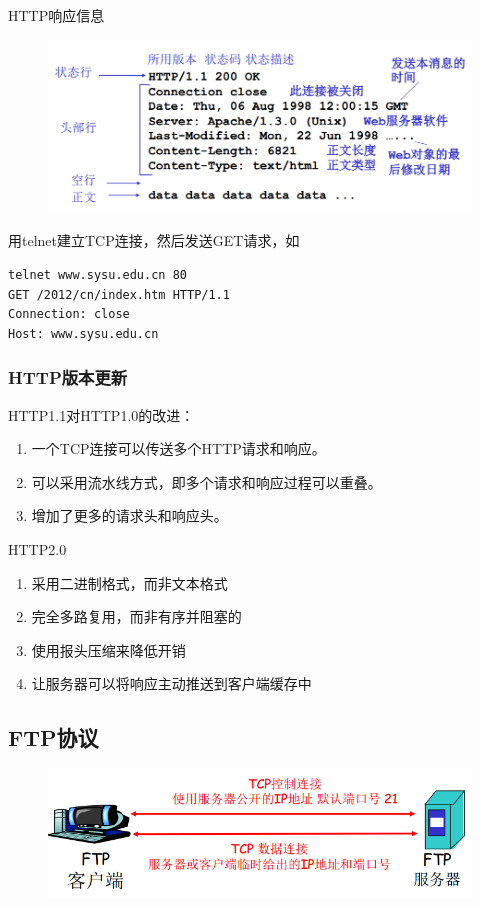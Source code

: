 HTTP响应信息
\begin{figure}[H]
    \centering
    \includegraphics[width=0.6\linewidth]{fig/http-respond.png}
\end{figure}

用telnet建立TCP连接，然后发送GET请求，如
\begin{lstlisting}
telnet www.sysu.edu.cn 80
GET /2012/cn/index.htm HTTP/1.1
Connection: close
Host: www.sysu.edu.cn
\end{lstlisting}

\subsubsection{HTTP版本更新}
HTTP1.1对HTTP1.0的改进：
\begin{enumerate}
\item 一个TCP连接可以传送多个HTTP请求和响应。
\item 可以采用流水线方式，即多个请求和响应过程可以重叠。
\item 增加了更多的请求头和响应头。
\end{enumerate}

HTTP2.0
\begin{enumerate}
\item 采用二进制格式，而非文本格式
\item 完全多路复用，而非有序并阻塞的
\item 使用报头压缩来降低开销
\item 让服务器可以将响应主动推送到客户端缓存中
\end{enumerate}

\subsection{FTP协议}
\begin{figure}[H]
\centering
\includegraphics[width=0.6\linewidth]{fig/FTP.png}
\end{figure}

